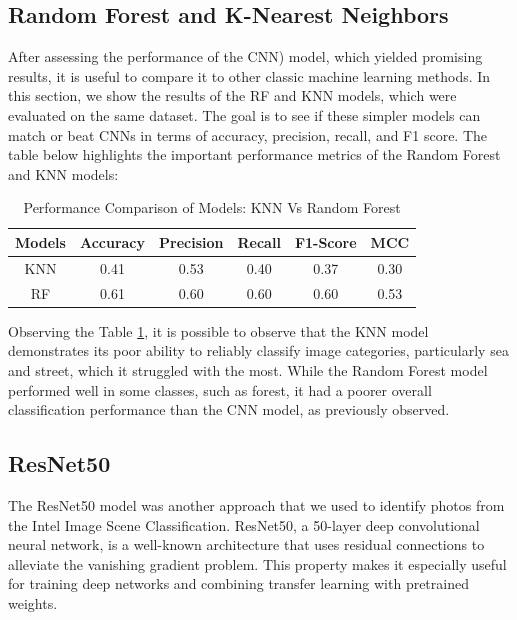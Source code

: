 \documentclass[conference]{IEEEtran}
\begin{document}

 

\subsection{Random Forest and K-Nearest Neighbors}
After assessing the performance of the \ac{CNN}) model, which yielded promising results, it is useful to compare it to other classic machine learning methods. In this section, we show the results of the \ac{RF} and \ac{KNN} models, which were evaluated on the same dataset. The goal is to see if these simpler models can match or beat CNNs in terms of accuracy, precision, recall, and F1 score. The table below highlights the important performance metrics of the Random Forest and KNN models:

\begin{table}[ht]
    \centering  
    \begin{tabular}{|c|c|c|c|c|c|}
    \hline
    \textbf{Models} & \textbf{Accuracy} & \textbf{Precision} & \textbf{Recall} & \textbf{F1-Score} & \textbf{MCC} \\  \hline
    \ac{KNN} & 0.41 & 0.53 & 0.40 & 0.37 & 0.30 \\ \hline
    \ac{RF} & 0.61 & 0.60 & 0.60 & 0.60 & 0.53\\ \hline

    \end{tabular}
    \caption{Performance Comparison of Models: KNN Vs Random Forest}
    \label{tab:comparison_modelsrf}
\end{table}

Observing the Table \ref{tab:comparison_modelsrf}, it is possible to observe that the \ac{KNN} model demonstrates its poor ability to reliably classify image categories, particularly sea and street, which it struggled with the most. While the Random Forest model performed well in some classes, such as forest, it had a poorer overall classification performance than the CNN model, as previously observed.



\subsection{ResNet50}
The ResNet50 model was another approach that we used to identify photos from the Intel Image Scene Classification. ResNet50, a 50-layer deep convolutional neural network, is a well-known architecture that uses residual connections to alleviate the vanishing gradient problem. This property makes it especially useful for training deep networks and combining transfer learning with pretrained weights. 
\end{document}
